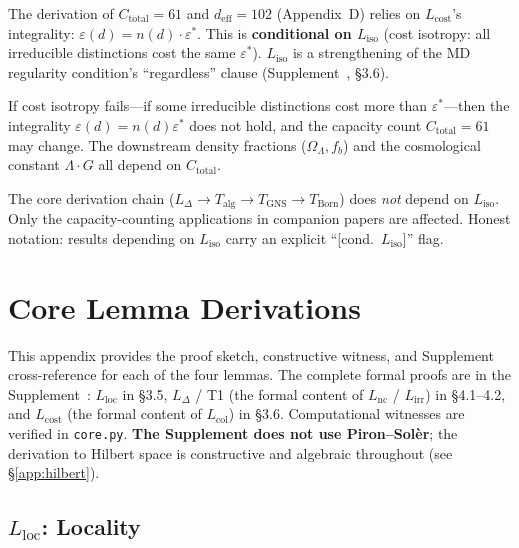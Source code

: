 \documentclass[11pt]{article}
\begin{document}
The derivation of $C_{\mathrm{total}} = 61$ and $d_{\mathrm{eff}} = 102$ (Appendix~D) relies on $L_{\mathrm{cost}}$'s integrality: $\varepsilon(d) = n(d) \cdot \varepsilon^*$.  This is \textbf{conditional on $L_{\mathrm{iso}}$} (cost isotropy: all irreducible distinctions cost the same $\varepsilon^*$).  $L_{\mathrm{iso}}$ is a strengthening of the MD regularity condition's ``regardless'' clause (Supplement~\cite{Supp}, §3.6).

If cost isotropy fails---if some irreducible distinctions cost more than $\varepsilon^*$---then the integrality $\varepsilon(d) = n(d)\varepsilon^*$ does not hold, and the capacity count $C_{\mathrm{total}} = 61$ may change.  The downstream density fractions ($\Omega_\Lambda, f_b$) and the cosmological constant $\Lambda\cdot G$ all depend on $C_{\mathrm{total}}$.

The core derivation chain ($L_\Delta \to T_{\mathrm{alg}} \to T_{\mathrm{GNS}} \to T_{\mathrm{Born}}$) does \emph{not} depend on $L_{\mathrm{iso}}$.  Only the capacity-counting applications in companion papers are affected.  Honest notation: results depending on $L_{\mathrm{iso}}$ carry an explicit ``[cond.\ $L_{\mathrm{iso}}$]'' flag.


\newpage
\appendix

\section{Core Lemma Derivations}
\label{app:core_lemmas}

This appendix provides the proof sketch, constructive witness, and Supplement cross-reference for each of the four lemmas.  The complete formal proofs are in the Supplement~\cite{Supp}: $L_{\mathrm{loc}}$ in §3.5, $L_\Delta$ / T1 (the formal content of $L_{\mathrm{nc}}$ / $L_{\mathrm{irr}}$) in §4.1--4.2, and $L_{\mathrm{cost}}$ (the formal content of $L_{\mathrm{col}}$) in §3.6.  Computational witnesses are verified in \texttt{core.py}.  \textbf{The Supplement does not use Piron--Sol\`er}; the derivation to Hilbert space is constructive and algebraic throughout (see §\ref{app:hilbert}).

\subsection{\texorpdfstring{$L_{\mathrm{loc}}$}{Lloc}: Locality}
\end{document}
